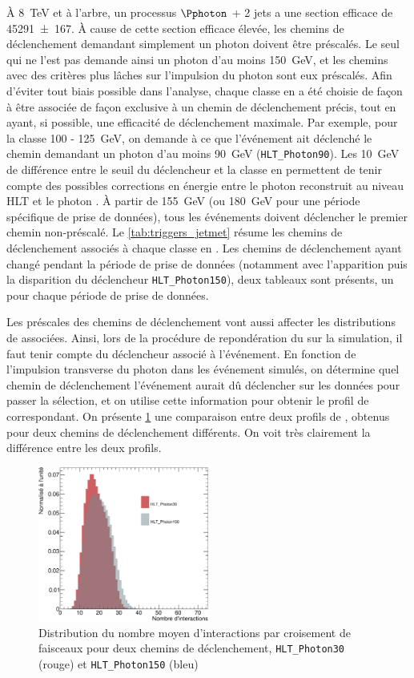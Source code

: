 À \SI{8}{\TeV} et à l'arbre, un processus $\Pphoton$ + 2 jets a une section efficace de \SI{45291 \pm 167}{\pb}. À cause de cette section efficace élevée, les chemins de déclenchement demandant simplement un photon doivent être préscalés. Le seul qui ne l'est pas demande ainsi un photon d'au moins \SI{150}{\GeV}, et les chemins avec des critères plus lâches sur l'impulsion du photon sont eux préscalés. Afin d'éviter tout biais possible dans l'analyse, chaque classe en \ptg{} a été choisie de façon à être associée de façon exclusive à un chemin de déclenchement précis, tout en ayant, si possible, une efficacité de déclenchement maximale. Par exemple, pour la classe 100 - \SI{125}{\GeV}, on demande à ce que l'événement ait déclenché le chemin demandant un photon d'au moins \SI{90}{\GeV} (\texttt{HLT\_Photon90}). Les \SI{10}{\GeV} de différence entre le seuil du déclencheur et la classe en \pt permettent de tenir compte des possibles corrections en énergie entre le photon reconstruit au niveau HLT et le photon \pf. À partir de \SI{155}{\GeV} (ou \SI{180}{\GeV} pour une période spécifique de prise de données), tous les événements doivent déclencher le premier chemin non-préscalé. Le \cref{tab:triggers_jetmet} résume les chemins de déclenchement associés à chaque classe en \ptg. Les chemins de déclenchement ayant changé pendant la période de prise de données (notamment avec l'apparition puis la disparition du déclencheur \texttt{HLT\_Photon150}), deux tableaux sont présents, un pour chaque période de prise de données.

Les préscales des chemins de déclenchement vont aussi affecter les distributions de \pu associées. Ainsi, lors de la procédure de repondération du \pu sur la simulation, il faut tenir compte du déclencheur associé à l'événement. En fonction de l'impulsion transverse du photon dans les événement simulés, on détermine quel chemin de déclenchement l'événement aurait dû déclencher sur les données pour passer la sélection, et on utilise cette information pour obtenir le profil de \pu correspondant. On présente \cref{fig:pu_jetmet} une comparaison entre deux profils de \pu, obtenus pour deux chemins de déclenchement différents. On voit très clairement la différence entre les deux profils.

\begin{figure}[tbp]
    \centering
    \includegraphics[width=0.5\textwidth]{chapitre4/figs/pu_plot.pdf}
    \caption{Distribution du nombre moyen d'interactions par croisement de faisceaux pour deux chemins de déclenchement, \texttt{HLT\_Photon30} (rouge) et \texttt{HLT\_Photon150} (bleu)}
    \label{fig:pu_jetmet}
\end{figure}

